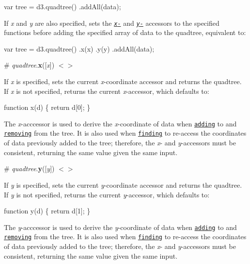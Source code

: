 \begin{DoxyCode}
var tree = d3.quadtree()
    .addAll(data);
\end{DoxyCode}


If {\itshape x} and {\itshape y} are also specified, sets the \href{#quadtree_x}{\tt {\itshape x}-\/} and \href{#quadtree_y}{\tt {\itshape y}-\/} accessors to the specified functions before adding the specified array of data to the quadtree, equivalent to\+:


\begin{DoxyCode}
var tree = d3.quadtree()
    .x(x)
    .y(y)
    .addAll(data);
\end{DoxyCode}


\label{_quadtree_x}%
\# {\itshape quadtree}.{\bfseries x}(\mbox{[}{\itshape x}\mbox{]}) \href{https://github.com/d3/d3-quadtree/blob/master/src/x.js}{\tt $<$$>$}

If {\itshape x} is specified, sets the current {\itshape x}-\/coordinate accessor and returns the quadtree. If {\itshape x} is not specified, returns the current {\itshape x}-\/accessor, which defaults to\+:


\begin{DoxyCode}
function x(d) \{
  return d[0];
\}
\end{DoxyCode}


The {\itshape x}-\/acccessor is used to derive the {\itshape x}-\/coordinate of data when \href{#quadtree_add}{\tt adding} to and \href{#quadtree_remove}{\tt removing} from the tree. It is also used when \href{#quadtree_find}{\tt finding} to re-\/access the coordinates of data previously added to the tree; therefore, the {\itshape x}-\/ and {\itshape y}-\/accessors must be consistent, returning the same value given the same input.

\label{_quadtree_y}%
\# {\itshape quadtree}.{\bfseries y}(\mbox{[}{\itshape y}\mbox{]}) \href{https://github.com/d3/d3-quadtree/blob/master/src/y.js}{\tt $<$$>$}

If {\itshape y} is specified, sets the current {\itshape y}-\/coordinate accessor and returns the quadtree. If {\itshape y} is not specified, returns the current {\itshape y}-\/accessor, which defaults to\+:


\begin{DoxyCode}
function y(d) \{
  return d[1];
\}
\end{DoxyCode}


The {\itshape y}-\/acccessor is used to derive the {\itshape y}-\/coordinate of data when \href{#quadtree_add}{\tt adding} to and \href{#quadtree_remove}{\tt removing} from the tree. It is also used when \href{#quadtree_find}{\tt finding} to re-\/access the coordinates of data previously added to the tree; therefore, the {\itshape x}-\/ and {\itshape y}-\/accessors must be consistent, returning the same value given the same input.

